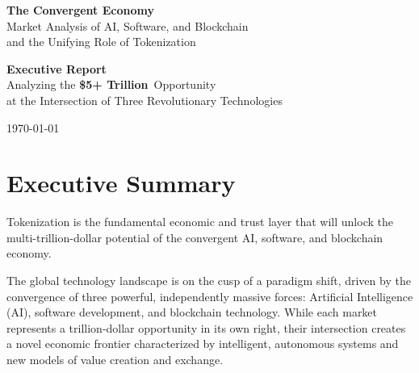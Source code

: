 \documentclass[11pt,a4paper]{report}
\newcommand{\marketvalue}[2]{\textcolor{trust}{\textbf{\$#1}}\,\textcolor{darkgray}{#2}}
\begin{document}
\begin{titlepage}
    \begin{center}
        {\Huge\bfseries\color{ocean} The Convergent Economy}\\[0.5cm]
        {\Large\color{sky} Market Analysis of \textcolor{ocean}{AI}, \textcolor{sky}{Software}, and \textcolor{sun}{Blockchain}}\\[0.3cm]
        {\Large\color{trust} and the Unifying Role of \textcolor{sun}{Tokenization}}\\[2cm]
        
        \begin{tcolorbox}[
            width=0.8\textwidth,
            colback=sky!5,
            colframe=ocean,
            boxrule=3pt,
            arc=0pt,
            outer arc=0pt
        ]            \centering\large
            \textbf{Executive Report}\\[0.5cm]
            Analyzing the \marketvalue{5+ Trillion}{} Opportunity\\
            at the Intersection of Three Revolutionary Technologies
        \end{tcolorbox}
        
        \vfill
        
        {\large\color{darkgray}\today}
    \end{center}
\end{titlepage}

\tableofcontents

\chapter*{Executive Summary}

\begin{keypoint}
Tokenization is the fundamental economic and trust layer that will unlock the multi-trillion-dollar potential of the convergent AI, software, and blockchain economy.
\end{keypoint}

The global technology landscape is on the cusp of a paradigm shift, driven by the convergence of three powerful, independently massive forces: Artificial Intelligence (AI), software development, and blockchain technology. While each market represents a trillion-dollar opportunity in its own right, their intersection creates a novel economic frontier characterized by intelligent, autonomous systems and new models of value creation and exchange.
\end{document}
